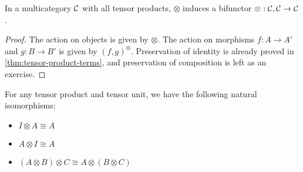 \begin{lemma}
  In a multicategory $\mathcal C$ with all tensor products, $\otimes$ induces a
  bifunctor ${\otimes} : \mathcal C, \mathcal C \to \mathcal C$.
\end{lemma}
\begin{proof}
  The action on objects is given by $\otimes$.
  The action on morphisms $f : A \to A'$ and $g : B \to B'$ is given by
  $(f, g)^{\otimes}$.
  Preservation of identity is already proved in \cref{thm:tensor-product-terms},
  and preservation of composition is left as an exercise.
\end{proof}

\begin{lemma}
  For any tensor product and tensor unit, we have the following natural
  isomorphisms:
  \begin{itemize}
    \item $I \otimes A \cong A$
    \item $A \otimes I \cong A$
    \item $(A \otimes B) \otimes C \cong A \otimes (B \otimes C)$
  \end{itemize}
\end{lemma}

